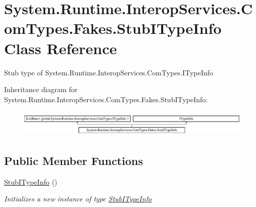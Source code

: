 \hypertarget{class_system_1_1_runtime_1_1_interop_services_1_1_com_types_1_1_fakes_1_1_stub_i_type_info}{\section{System.\-Runtime.\-Interop\-Services.\-Com\-Types.\-Fakes.\-Stub\-I\-Type\-Info Class Reference}
\label{class_system_1_1_runtime_1_1_interop_services_1_1_com_types_1_1_fakes_1_1_stub_i_type_info}
}


Stub type of System.\-Runtime.\-Interop\-Services.\-Com\-Types.\-I\-Type\-Info 


Inheritance diagram for System.\-Runtime.\-Interop\-Services.\-Com\-Types.\-Fakes.\-Stub\-I\-Type\-Info\-:\begin{figure}[H]
\begin{center}
\leavevmode
\includegraphics[height=1.287356cm]{class_system_1_1_runtime_1_1_interop_services_1_1_com_types_1_1_fakes_1_1_stub_i_type_info}
\end{center}
\end{figure}
\subsection*{Public Member Functions}
\begin{DoxyCompactItemize}
\item 
\hyperlink{class_system_1_1_runtime_1_1_interop_services_1_1_com_types_1_1_fakes_1_1_stub_i_type_info_ae61f5095975c819f5ebb03c5666cc669}{Stub\-I\-Type\-Info} ()
\begin{DoxyCompactList}\small\item\em Initializes a new instance of type \hyperlink{class_system_1_1_runtime_1_1_interop_services_1_1_com_types_1_1_fakes_1_1_stub_i_type_info}{Stub\-I\-Type\-Info}\end{DoxyCompactList}\end{DoxyCompactItemize}
